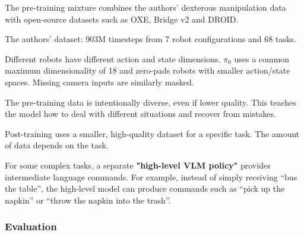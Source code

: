 \begin{dashlist}

\item The pre-training mixture combines the authors' dexterous manipulation data with open-source datasets such as OXE, Bridge v2 and DROID.

\item The authors' dataset: 903M timesteps from 7 robot configurations and 68 tasks.


\item Different robots have different action and state dimensions. $\pi_0$ uses a common maximum dimensionality of 18 and zero-pads robots with smaller action/state spaces. Missing camera inputs are similarly masked.

\item The pre-training data is intentionally diverse, even if lower quality. This teaches the model how to deal with different situations and recover from mistakes.

\item Post-training uses a smaller, high-quality dataset for a specific task. The amount of data depends on the task.

\item For some complex tasks, a separate \textbf{"high-level VLM policy"} provides intermediate language commands. For example, instead of simply receiving ``bus the table'', the high-level model can produce commands such as ``pick up the napkin'' or ``throw the napkin into the trash''.

\end{dashlist}

\subsubsection{Evaluation}

